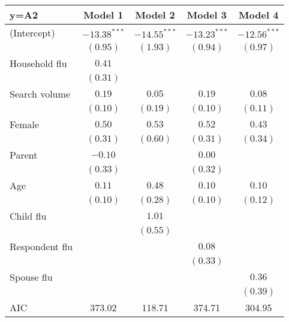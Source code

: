 \documentclass[12pt]{article}
\begin{document}
\begin{table}
\begin{center}
\begin{tabular}{l c c c c }
\hline
y=A2 & Model 1 & Model 2 & Model 3 & Model 4 \\
\hline
(Intercept)    & $-13.38^{***}$ & $-14.55^{***}$ & $-13.23^{***}$ & $-12.56^{***}$ \\
               & $(0.95)$       & $(1.93)$       & $(0.94)$       & $(0.97)$       \\
Household flu  & $0.41$         &                &                &                \\
               & $(0.31)$       &                &                &                \\
Search volume         & $0.19$         & $0.05$         & $0.19$         & $0.08$         \\
               & $(0.10)$       & $(0.19)$       & $(0.10)$       & $(0.11)$       \\
Female         & $0.50$         & $0.53$         & $0.52$         & $0.43$         \\
               & $(0.31)$       & $(0.60)$       & $(0.31)$       & $(0.34)$       \\
Parent         & $-0.10$        &                & $0.00$         &                \\
               & $(0.33)$       &                & $(0.32)$       &                \\
Age            & $0.11$         & $0.48$         & $0.10$         & $0.10$         \\
               & $(0.10)$       & $(0.28)$       & $(0.10)$       & $(0.12)$       \\
Child flu         &                & $1.01$         &                &                \\
               &                & $(0.55)$       &                &                \\
Respondent flu          &                &                & $0.08$         &                \\
               &                &                & $(0.33)$       &                \\
Spouse flu          &                &                &                & $0.36$         \\
               &                &                &                & $(0.39)$       \\
\hline
AIC            & 373.02         & 118.71         & 374.71         & 304.95         \\

\end{tabular}
\end{center}
\end{table}
\end{document}
